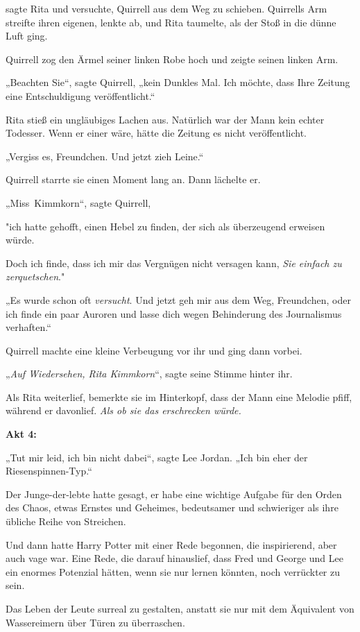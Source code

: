 {sagte Rita und versuchte, Quirrell aus dem Weg zu schieben. Quirrells Arm streifte ihren eigenen, lenkte ab, und Rita taumelte, als der Stoß in die dünne Luft ging.

Quirrell zog den Ärmel seiner linken Robe hoch und zeigte seinen linken Arm.

„Beachten Sie“, sagte Quirrell, „kein Dunkles Mal. Ich möchte, dass Ihre Zeitung eine Entschuldigung veröffentlicht.“

Rita stieß ein ungläubiges Lachen aus. Natürlich war der Mann kein echter Todesser. Wenn er einer wäre, hätte die Zeitung es nicht veröffentlicht.

„Vergiss es, Freundchen. Und jetzt zieh Leine.“

Quirrell starrte sie einen Moment lang an. Dann lächelte er.

„Miss~Kimmkorn“, sagte Quirrell,

"ich hatte gehofft, einen Hebel zu finden, der sich als überzeugend erweisen würde.

Doch ich finde, dass ich mir das Vergnügen nicht versagen kann, \emph{Sie einfach zu zerquetschen}."

„Es wurde schon oft \emph{versucht}. Und jetzt geh mir aus dem Weg, Freundchen, oder ich finde ein paar Auroren und lasse dich wegen Behinderung des Journalismus verhaften.“

Quirrell machte eine kleine Verbeugung vor ihr und ging dann vorbei.

„\emph{Auf Wiedersehen, Rita Kimmkorn}“, sagte seine Stimme hinter ihr.

Als Rita weiterlief, bemerkte sie im Hinterkopf, dass der Mann eine Melodie pfiff, während er davonlief. \emph{Als ob sie das erschrecken würde.}

\textbf{Akt 4:}

„Tut mir leid, ich bin nicht dabei“, sagte Lee Jordan. „Ich bin eher der Riesenspinnen-Typ.“

Der Junge-der-lebte hatte gesagt, er habe eine wichtige Aufgabe für den Orden des Chaos, etwas Ernstes und Geheimes, bedeutsamer und schwieriger als ihre übliche Reihe von Streichen.

Und dann hatte Harry Potter mit einer Rede begonnen, die inspirierend, aber auch vage war. Eine Rede, die darauf hinauslief, dass Fred und George und Lee ein enormes Potenzial hätten, wenn sie nur lernen könnten, noch verrückter zu sein.

Das Leben der Leute surreal zu gestalten, anstatt sie nur mit dem Äquivalent von Wassereimern über Türen zu überraschen.

}
